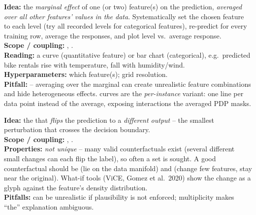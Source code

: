 \begin{algobox}
\textbf{Idea:} the \emph{marginal effect} of one (or two) feature(s) on the
prediction, \emph{averaged over all other features' values in the data}.
Systematically set the chosen feature to each level (try all recorded levels for
categorical features), re-predict for every training row, average the responses,
and plot level vs.\ average response.\\
\textbf{Scope / coupling:} , .\\
\textbf{Reading:} a curve (quantitative feature) or bar chart (categorical),
e.g.\ predicted bike rentals rise with temperature, fall with humidity/wind.\\
\textbf{Hyperparameters:} which feature(s); grid resolution.\\
\textbf{Pitfall:}  -- averaging over the
marginal can create unrealistic feature combinations and hide heterogeneous
effects.  curves are the
\emph{per-instance} variant: one line per data point instead of the average,
exposing interactions the averaged PDP masks.
\end{algobox}

\begin{algobox}
\textbf{Idea:} the  that
\emph{flips} the prediction to a \emph{different output} -- the smallest
perturbation that crosses the decision boundary.\\
\textbf{Scope / coupling:} , .\\
\textbf{Properties:} \emph{not unique} -- many valid counterfactuals exist
(several different small changes can each flip the label), so often a set is
sought. A good counterfactual should be  (lie on the
data manifold) and  (change few features, stay near the
original). What-if tools (ViCE, Gomez et al.\ 2020) show the change as a glyph
against the feature's density distribution.\\
\textbf{Pitfalls:} can be unrealistic if plausibility is not enforced;
multiplicity makes ``the'' explanation ambiguous.
\end{algobox}

